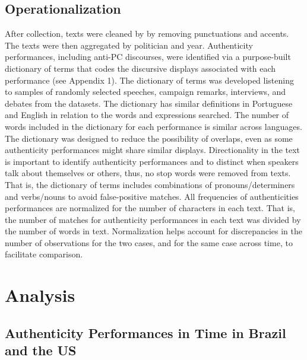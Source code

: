 \documentclass[smallextended]{svjour3}       %
\begin{document}
\hypertarget{operationalization}{%
\subsection{Operationalization}\label{operationalization}}

After collection, texts were cleaned by by removing punctuations and
accents. The texts were then aggregated by politician and year.
Authenticity performances, including anti-PC discourses, were identified
via a purpose-built dictionary of terms that codes the discursive
displays associated with each performance (see Appendix 1). The
dictionary of terms was developed listening to samples of randomly
selected speeches, campaign remarks, interviews, and debates from the
datasets. The dictionary has similar definitions in Portuguese and
English in relation to the words and expressions searched. The number of
words included in the dictionary for each performance is similar across
languages. The dictionary was designed to reduce the possibility of
overlaps, even as some authenticity performances might share similar
displays. Directionality in the text is important to identify
authenticity performances and to distinct when speakers talk about
themselves or others, thus, no stop words were removed from texts. That
is, the dictionary of terms includes combinations of
pronouns/determiners and verbs/nouns to avoid false-positive matches.
All frequencies of authenticities performances are normalized for the
number of characters in each text. That is, the number of matches for
authenticity performances in each text was divided by the number of
words in text. Normalization helps account for discrepancies in the
number of observations for the two cases, and for the same case across
time, to facilitate comparison.

\hypertarget{analysis}{%
\section{Analysis}\label{analysis}}

\hypertarget{authenticity-performances-in-time-in-brazil-and-the-us}{%
\subsection{Authenticity Performances in Time in Brazil and the
US}\label{authenticity-performances-in-time-in-brazil-and-the-us}}
\end{document}
